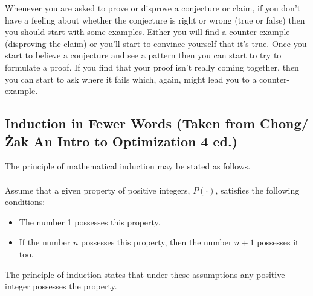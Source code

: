 \noindent Whenever you are asked to prove or disprove a conjecture or claim, if you don't have a feeling about whether the conjecture is right or wrong (true or false) then you should start with some examples.  Either you will find a counter-example (disproving the claim) or you'll start to convince yourself that it's true.  Once you start to believe a conjecture and see a pattern then you can start to try to formulate a proof.  If you find that your proof isn't really coming together, then you can start to ask where it fails which, again, might lead you to a counter-example.


\subsection{Induction in Fewer Words (Taken from Chong/\.Zak An Intro to Optimization 4 ed.)}
The principle of mathematical induction may be stated as follows. \\ \\
Assume that a given property of positive integers, $P(\cdot)$, satisfies the following conditions:
\begin{itemize}
    \item The number 1 possesses this property.
    \item If the number $n$ possesses this property, then the number $n + 1$ possesses it too.
\end{itemize}
The principle of induction states that under these assumptions any positive integer possesses the
property.\\

